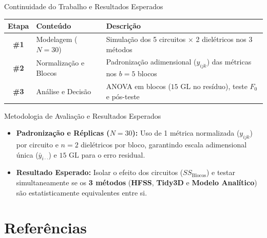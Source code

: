 \documentclass[aspectratio=169,xcolor=table]{beamer}
\begin{document}
\begin{frame}{Continuidade do Trabalho e Resultados Esperados}
    \begin{table}[]
    \centering
    \footnotesize
    \renewcommand{\arraystretch}{1.45}
    \begin{tabular}{|c|l|l|}
    \hline
    \rowcolor{gray!15}
    \textbf{\textcolor{meuvermelho}{Etapa}} & \textbf{\textcolor{meuvermelho}{Conteúdo}} & \textbf{\textcolor{meuvermelho}{Descrição}} \\ \hline
    \textbf{\#1} & Modelagem ($N=30$) & Simulação dos 5 circuitos $\times$ 2 dielétricos nos 3 métodos \\ \hline
    \textbf{\#2} & Normalização e Blocos & Padronização adimensional ($y_{ijk}$) das métricas nos $b=5$ blocos \\ \hline
    \textbf{\#3} & Análise e Decisão & ANOVA em blocos ($15\text{ GL}$ no resíduo), teste $F_0$ e pós-teste \\ \hline
    \end{tabular}
    \end{table}

    \vspace{0.25cm}
    \begin{block}{Metodologia de Avaliação e Resultados Esperados}
        \footnotesize
        \begin{itemize}\setlength{\itemsep}{4pt}
            \item \textbf{Padronização e Réplicas ($N=30$):} Uso de 1 métrica normalizada ($y_{ijk}$) por circuito e $n=2$ dielétricos por bloco, garantindo escala adimensional única ($\bar{y}_{i\cdot\cdot}$) e $15\text{ GL}$ para o erro residual.
            \item \textbf{Resultado Esperado:} Isolar o efeito dos circuitos ($SS_{\text{Blocos}}$) e testar simultaneamente se os \textbf{3 métodos} (\textbf{HFSS}, \textbf{Tidy3D} e \textbf{Modelo Analítico}) são estatisticamente equivalentes entre si.
        \end{itemize}
    \end{block}
\end{frame}

\section{Referências}
\end{document}
